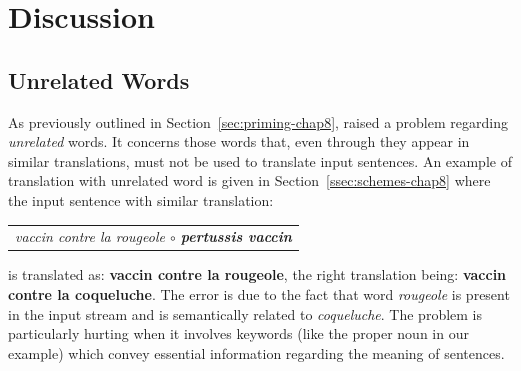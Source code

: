 \begin{table}[ht]
\begin{center}
\end{center}
  \caption{Translation performance for the \texttt{NEWS} and \texttt{WIKI} domain test sets using similar sentences retrieved from parallel data (par) and from both parallel and monolingual (par+mon) data. The first two rows correspond to experiments already shown in Table~\ref{tab:results1-chap8}.}
  \label{tab:results2-chap8}
\end{table}

\section{Discussion}
\label{sec:discussion-chap8}

\subsection*{Unrelated Words} 

As previously outlined in Section~\ref{sec:priming-chap8}, \citet{xu20boosting} raised a problem regarding {\em unrelated} words. 
It concerns those words that, even through they appear in similar translations, must not be used to translate input sentences. 
An example of translation with unrelated word is given in Section~\ref{ssec:schemes-chap8}
%
where the input sentence with similar translation:
\begin{center}
\begin{tabular}{c}
\it vaccin contre la rougeole $\circ$ {\bf pertussis vaccin} \\
\end{tabular}
\end{center}
\noindent is translated as: {\bf vaccin contre la rougeole}, 
the right translation being: {\bf vaccin contre la coqueluche}.
The error is due to the fact that word \textit{rougeole} is present in the input stream and is semantically related to \textit{coqueluche}.
The problem is particularly hurting when it involves keywords (like the proper noun in our example) which convey essential information regarding the meaning of sentences.

